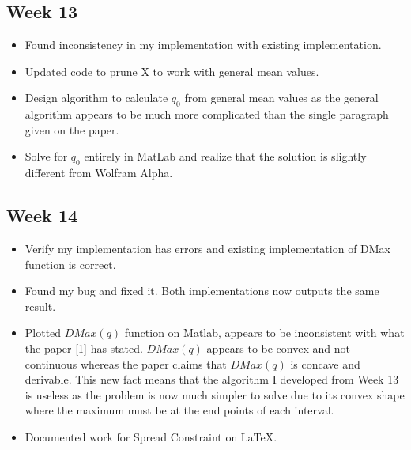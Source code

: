 \documentclass[a4paper,12pt]{article}
\begin{document}
\subsection{Week 13}
	\begin{itemize}
		\item Found inconsistency in my implementation with existing implementation.
		\item Updated code to prune X to work with general mean values.
		\item Design algorithm to calculate $q_{0}$ from general mean values as the general algorithm appears to be much more complicated than the single paragraph given on the paper.  
		\item Solve for $q_{0}$ entirely in MatLab and realize that the solution is slightly different from Wolfram Alpha.
	\end{itemize}
	 	
\subsection{Week 14}
	\begin{itemize}
		\item Verify my implementation has errors and existing implementation of DMax function is correct. 
		\item Found my bug and fixed it. Both implementations now outputs the same result. 
		\item Plotted $DMax(q)$ function on Matlab, appears to be inconsistent with what the paper [1] has stated. $DMax(q)$ appears to be convex and not continuous whereas the paper claims that $DMax(q)$ is concave and derivable. This new fact means that the algorithm I developed from Week 13 is useless as the problem is now much simpler to solve due to its convex shape where the maximum must be at the end points of each interval.  
		\item Documented work for Spread Constraint on \LaTeX. 
	\end{itemize}
\end{document}
